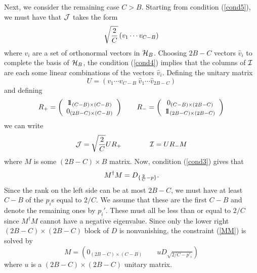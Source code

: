 \documentclass[12pt]{article}
\theoremstyle{definition}
\newcommand{\be}{\begin{equation}}
\newcommand{\ee}{\end{equation}}
\newcommand{\ba}{\begin{array}}
\newcommand{\ea}{\end{array}}
\def\identity{{\rlap{1} \hskip 1.6pt \hbox{1}}}
\begin{document}
Next, we consider the remaining case $C > B$. Starting from condition (\ref{cond5}), we must have that ${\cal J}$ takes the form
\be
\sqrt{2 \over C} \left( v_1 \cdots v_{C-B} \right)
\ee
where $v_i$ are a set of orthonormal vectors in ${\cal H}_B$. Choosing $2B-C$ vectors $\hat{v}_i$ to complete the basis of ${\cal H}_B$, the condition (\ref{cond4}) implies that the columns of ${\cal I}$ are each some linear combinations of the vectors $\hat{v}_i$. Defining the unitary matrix
\be
U = \left( v_1 \cdots v_{C-B} \;  \hat{v}_1 \cdots \hat{v}_{2B - C} \right)
\ee
and defining
\be
R_+ = \left( \ba{c} \identity_{(C-B) \times (C - B)} \cr 0_{(2B - C) \times (C - B)} \ea \right) \qquad R_- = \left( \ba{c} 0_{(C-B) \times (2B - C)} \cr \identity_{(2B - C) \times (2B - C)} \ea \right)
\ee
we can write
\be
{\cal J} = \sqrt{2 \over C} U R_+ \qquad \qquad {\cal I} = U R_- M
\ee
where $M$ is some $(2B - C) \times B$ matrix. Now, condition (\ref{cond3}) gives that
\be
\label{MM}
M^\dagger M = D_{\{{2 \over C}-p\}}.
\ee
Since the rank on the left side can be at most $2B -C$, we must have at least $C -B$ of the $p_i$s equal to $2/C$. We assume that these are the first $C-B$ and denote the remaining ones by $p_i'$. These must all be less than or equal to $2/C$ since $M^\dagger M$ cannot have a negative eigenvalue. Since only the lower right $(2B -C) \times (2B - C)$ block of $D$ is nonvanishing, the constraint (\ref{MM}) is solved by
\be
M = \left( 0_{(2B-C) \times (C-B)} \qquad u D_{\sqrt{2/C-p'_i}} \right)
\ee
where $u$ is a $(2B-C) \times (2B - C)$ unitary matrix.
\end{document}

